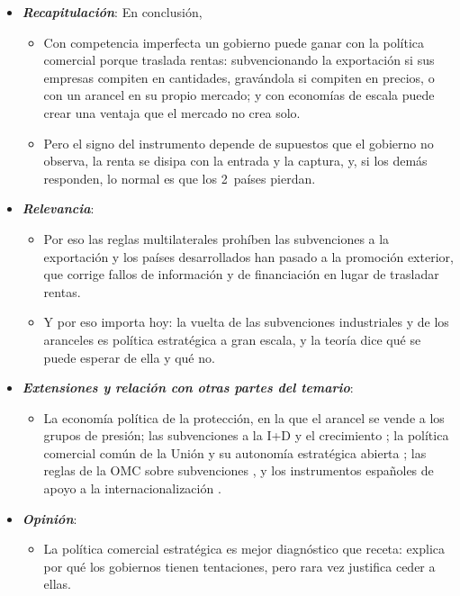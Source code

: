\documentclass[11pt]{article}
\begin{document}
\begin{itemize}
\item \textbf{\emph{Recapitulación}}: En conclusión,
  \begin{itemize}
  \item Con competencia imperfecta un gobierno puede ganar con la política comercial porque traslada rentas: subvencionando la exportación si sus empresas compiten en cantidades, gravándola si compiten en precios, o con un arancel en su propio mercado; y con economías de escala puede crear una ventaja que el mercado no crea solo.

  \item Pero el signo del instrumento depende de supuestos que el gobierno no observa, la renta se disipa con la entrada y la captura, y, si los demás responden, lo normal es que los 2~países pierdan.
  \end{itemize}
\item \textbf{\emph{Relevancia}}:
  \begin{itemize}
  \item Por eso las reglas multilaterales prohíben las subvenciones a la exportación y los países desarrollados han pasado a la promoción exterior, que corrige fallos de información y de financiación en lugar de trasladar rentas.

  \item Y por eso importa hoy: la vuelta de las subvenciones industriales y de los aranceles es política estratégica a gran escala, y la teoría dice qué se puede esperar de ella y qué no.
  \end{itemize}
\item \textbf{\emph{Extensiones y relación con otras partes del temario}}:
  \begin{itemize}
  \item La economía política de la protección, en la que el arancel se vende a los grupos de presión\nocite{GrossmanHelpman1994Protection}; las subvenciones a la I+D y el crecimiento ; la política comercial común de la Unión y su autonomía estratégica abierta ; las reglas de la OMC sobre subvenciones , y los instrumentos españoles de apoyo a la internacionalización .
  \end{itemize}
\item \textbf{\emph{Opinión}}:
  \begin{itemize}
  \item La política comercial estratégica es mejor diagnóstico que receta: explica por qué los gobiernos tienen tentaciones, pero rara vez justifica ceder a ellas.


\end{itemize}
\end{itemize}
\end{document}
